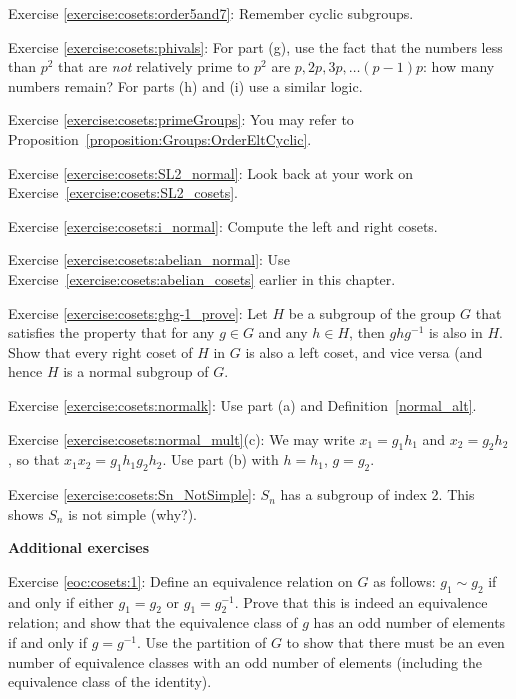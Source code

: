 \noindent Exercise \ref{exercise:cosets:order5and7}:  Remember cyclic subgroups.

\noindent Exercise \ref{exercise:cosets:phivals}:   For part (g), use the fact that the numbers less than $p^2$ that are \emph{not} relatively prime to $p^2$ are $p, 2p, 3p, \ldots (p-1)p$: how many numbers remain? For parts (h) and (i) use a similar logic.
 
\noindent Exercise \ref{exercise:cosets:primeGroups}:
You may refer to Proposition~\ref{proposition:Groups:OrderEltCyclic}.

\noindent Exercise \ref{exercise:cosets:SL2_normal}:
Look back at your work on Exercise~\ref{exercise:cosets:SL2_cosets}.

\noindent Exercise \ref{exercise:cosets:i_normal}:
Compute the left and right cosets.

\noindent Exercise \ref{exercise:cosets:abelian_normal}: Use  Exercise~\ref{exercise:cosets:abelian_cosets} earlier in this chapter.

\noindent Exercise \ref{exercise:cosets:ghg-1_prove}: Let $H$ be a subgroup of the group $G$ that satisfies the property that  for any $g \in G$ and any $h \in H$, then $ghg^{-1}$ is also in $H$. Show that every right coset of $H$ in $G$ is also a left coset, and vice versa (and hence $H$ is a normal subgroup of $G$.

\noindent Exercise \ref{exercise:cosets:normalk}:   Use part (a) and Definition~\ref{normal_alt}.

\noindent Exercise \ref{exercise:cosets:normal_mult}(c):  We may write $x_1 = g_1 h_1$ and $x_2 = g_2 h_2$, so that $x_1 x_2 = g_1 h_1 g_2 h_2$.  Use part (b) with $h=h_1$, $g=g_2$.

\noindent Exercise \ref{exercise:cosets:Sn_NotSimple}:  $S_n$ has a subgroup of index 2.  This shows $S_n$ is not simple  (why?).
\medskip

\textbf{Additional exercises}

\noindent Exercise \ref{eoc:cosets:1}:  Define an equivalence relation on $G$ as follows: $g_1 \sim g_2$ if and only if either $g_1 = g_2$ or $g_1 = g_2^{-1}$. Prove that this is indeed an equivalence relation; and show that the equivalence class of $g$ has an odd number of elements if and only if $g = g^{-1}$. Use the partition of $G$ to show that there must be an even number of  equivalence classes with an odd number of elements (including the equivalence class of the identity).

